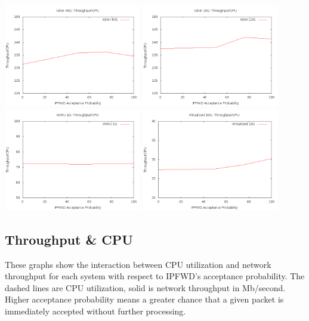 \documentclass[journal]{IEEEtran}
\begin{document}
  \begin{center}
  \includegraphics[width=0.45\textwidth]{toc_isilon40}
  \includegraphics[width=0.45\textwidth]{toc_isilon10}
  \includegraphics[width=0.45\textwidth]{toc_wwu1}
  \includegraphics[width=0.45\textwidth]{toc_virtual10}
  \end{center}
  
  \subsection{Throughput \& CPU}
  These graphs show the interaction between CPU utilization and network throughput for each system with respect to IPFWD's acceptance probability. The dashed lines are CPU utilization, solid is network throughput in Mb/second. Higher acceptance probability means a greater chance that a given packet is immediately accepted without further processing.
  
\end{document}

